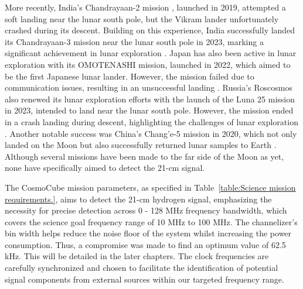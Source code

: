 \documentclass[fleqn,usenatbib]{rasti}
\begin{document}
More recently, India’s Chandrayaan-2 mission \citep{chand2}, launched in 2019, attempted a soft landing near the lunar south pole, but the Vikram lander unfortunately crashed during its descent. Building on this experience, India successfully landed its Chandrayaan-3 mission near the lunar south pole in 2023, marking a significant achievement in lunar exploration \citep{Chandrayaan3ISRO}. Japan has also been active in lunar exploration with its OMOTENASHI mission, launched in 2022, which aimed to be the first Japanese lunar lander. However, the mission failed due to communication issues, resulting in an unsuccessful landing \citep{OMOTENASHI19}. Russia’s Roscosmos also renewed its lunar exploration efforts with the launch of the Luna 25 mission in 2023, intended to land near the lunar south pole. However, the mission ended in a crash landing during descent, highlighting the challenges of lunar exploration \citep{Mitrofanov2021Luna25}. Another notable success was China’s Chang’e-5 mission in 2020, which not only landed on the Moon but also successfully returned lunar samples to Earth \citep{Zhou22}. Although several missions have been made to the far side of the Moon as yet, none have specifically aimed to detect the 21-cm signal.

The CosmoCube mission parameters, as specified in Table~\ref{table:Science mission requirements.}, aims to detect the 21-cm hydrogen signal, emphasizing the necessity for precise detection across 0 - 128 MHz frequency bandwidth, which covers the science goal frequency range of 10 MHz to 100 MHz. The channelizer's bin width helps reduce the noise floor of the system whilst increasing the power consumption. Thus, a compromise was made to find an optimum value of 62.5 kHz. This will be detailed in the later chapters. The clock frequencies are carefully synchronized and chosen to facilitate the identification of potential signal components from external sources within our targeted frequency range.
\end{document}
